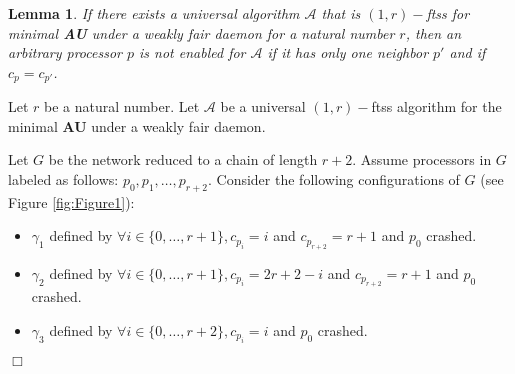 \documentclass[11pt,english,letterpaper]{article}
\newtheorem{lemma}{Lemma}
\newenvironment{proof}{{\noindent\bf Proof. } }{{\hfill $\Box$}}
\begin{document}
\begin{lemma}\label{lem:impWFMin}
If there exists a universal algorithm $\mathcal{A}$ that is $(1,r)-$ftss for minimal \textbf{AU} under a weakly fair daemon for a natural number $r$, then an arbitrary processor $p$ is not enabled for $\mathcal{A}$ if it has only one neighbor $p'$ and if $c_{p}=c_{p'}$.
\end{lemma}

\begin{proof}
Let $r$ be a natural number. Let $\mathcal{A}$ be a universal $(1,r)-$ftss algorithm for the minimal \textbf{AU} under a weakly fair daemon.

Let $G$ be the network reduced to a chain of length $r+2$. Assume processors in $G$ labeled as follows: $p_{0},p_{1},\ldots,p_{r+2}$. Consider the following configurations of $G$ (see Figure \ref{fig:Figure1}):

\begin{itemize}
\item $\gamma_{1}$ defined by $\forall i\in \{0,\ldots,r+1\},c_{p_{i}}=i$ and $c_{p_{r+2}}=r+1$ and $p_{0}$ crashed.
\item $\gamma_{2}$ defined by $\forall i\in \{0,\ldots,r+1\},c_{p_{i}}=2r+2-i$ and $c_{p_{r+2}}=r+1$ and $p_{0}$ crashed.
\item $\gamma_{3}$ defined by $\forall i\in \{0,\ldots,r+2\},c_{p_{i}}=i$ and $p_{0}$ crashed.
\end{itemize}


\end{proof}
\end{document}
